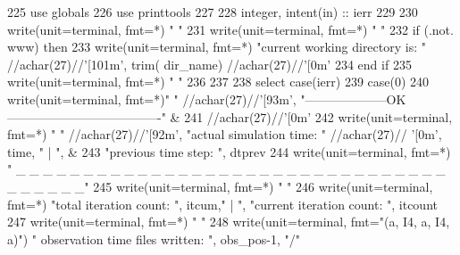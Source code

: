 \begin{DoxyCode}
225       \textcolor{keywordtype}{use }globals
226       \textcolor{keywordtype}{use }printtools
227 
228       \textcolor{keywordtype}{integer}, \textcolor{keywordtype}{intent(in)} :: ierr
229 
230       \textcolor{keyword}{write}(unit=terminal, fmt=*) \textcolor{stringliteral}{" "}
231       \textcolor{keyword}{write}(unit=terminal, fmt=*) \textcolor{stringliteral}{" "}
232       \textcolor{keywordflow}{if} (.not. www) \textcolor{keywordflow}{then}
233         \textcolor{keyword}{write}(unit=terminal, fmt=*) \textcolor{stringliteral}{"current working directory is: "} //achar(27\textcolor{comment}{)//}\textcolor{stringliteral}{'[101m'}\textcolor{comment}{, trim(
      dir_name) //achar(27)//}\textcolor{stringliteral}{'[0m'}
234 \textcolor{keywordflow}{      end if}
235       \textcolor{keyword}{write}(unit=terminal, fmt=*) \textcolor{stringliteral}{" "}
236 
237 
238       \textcolor{keywordflow}{select case}(ierr)
239         \textcolor{keywordflow}{case}(0)
240           \textcolor{keyword}{write}(unit=terminal, fmt=*)\textcolor{stringliteral}{" "} //achar(27)//\textcolor{stringliteral}{'[93m'},  \textcolor{stringliteral}{
      "--------------------OK-------------------------------------"}\textcolor{comment}{ &}
241 \textcolor{comment}{                                          //achar(27)//}\textcolor{stringliteral}{'[0m'}
242           \textcolor{keyword}{write}(unit=terminal, fmt=*) \textcolor{stringliteral}{" "} //achar(27)//\textcolor{stringliteral}{'[92m'}, \textcolor{stringliteral}{"actual simulation time: "}\textcolor{comment}{ //achar(27)//}\textcolor{stringliteral}{
      '[0m'}\textcolor{comment}{, time, }\textcolor{stringliteral}{"  | "}\textcolor{comment}{, &}
243 \textcolor{comment}{                                      }\textcolor{stringliteral}{"previous time step: "}, dtprev
244           \textcolor{keyword}{write}(unit=terminal, fmt=*) \textcolor{stringliteral}{"       \_ \_ \_ \_ \_ \_ \_ \_ \_ \_ \_ \_ \_ \_ \_ \_ \_ \_ \_ \_ \_ \_ \_ \_ \_ \_ \_ \_ \_ \_ \_
       \_ \_ \_ \_ \_ \_ \_"}
245           \textcolor{keyword}{write}(unit=terminal, fmt=*) \textcolor{stringliteral}{"  "}
246           \textcolor{keyword}{write}(unit=terminal, fmt=*) \textcolor{stringliteral}{"total iteration count: "}, itcum,\textcolor{stringliteral}{"         | "}\textcolor{comment}{, }\textcolor{stringliteral}{"current iteration
       count: "}\textcolor{comment}{, itcount}
247 \textcolor{comment}{          }\textcolor{keyword}{write}(unit=terminal, fmt=*) \textcolor{stringliteral}{"  "}
248           \textcolor{keyword}{write}(unit=terminal, fmt=\textcolor{stringliteral}{"(a, I4, a, I4, a)"}) \textcolor{stringliteral}{" observation time files written: "}\textcolor{comment}{, obs\_pos-1, }\textcolor{stringliteral}{"/"}\textcolor{comment}{
}
\end{DoxyCode}
